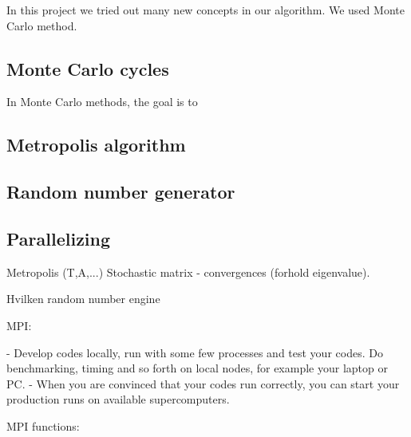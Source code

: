 In this project we tried out many new concepts in our algorithm. We used Monte Carlo method. 


\subsection{Monte Carlo cycles}

In Monte Carlo methods, the goal is to 





\subsection{Metropolis algorithm}

\subsection{Random number generator}

\subsection{Parallelizing}



Metropolis (T,A,...)
	Stochastic matrix  - convergences (forhold eigenvalue).
	
	Hvilken random number engine
	
MPI:	
	
- Develop codes locally, run with some few processes and test your codes. Do benchmarking, timing and so forth on local nodes, for example your laptop or PC.
- When you are convinced that your codes run correctly, you can start your production runs on available supercomputers.
	
	
MPI functions:
%
%
%
%
%
%
%
